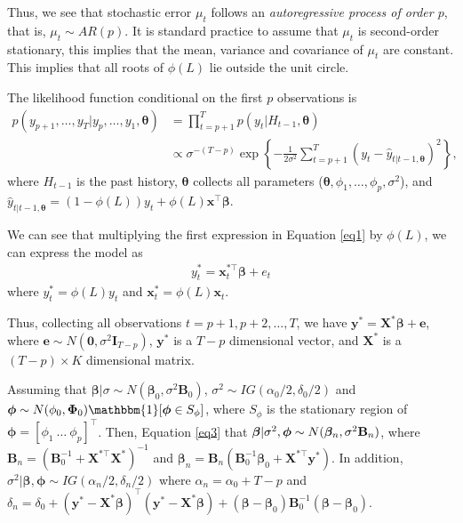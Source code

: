 Thus, we see that stochastic error $\mu_t$ follows an \textit{autoregressive process of order $p$}, that is, $\mu_t\sim AR(p)$. It is standard practice to assume that $\mu_t$ is second-order stationary, this implies that the mean, variance and covariance of $\mu_t$ are constant. This implies that all roots of $\phi(L)$ lie outside the unit circle.

The likelihood function conditional on the first $p$ observations is
\begin{align*}
	p(y_{p+1},\dots,y_T|y_{p},\dots,y_1,\bm{\theta})&=\prod_{t=p+1}^{T}p(y_t|H_{t-1},\bm{\theta})\\
	&\propto \sigma^{-(T-p)}\exp\left\{-\frac{1}{2\sigma^2}\sum_{t=p+1}^T(y_t-\hat{y}_{t|t-1,\bm{\theta}})^2\right\},
\end{align*} 
where $H_{t-1}$ is the past history, $\bm{\theta}$ collects all parameters ($\bm{\theta}, \phi_1,\dots,\phi_p, \sigma^2$), and $\hat{y}_{t|t-1,\bm{\theta}}=(1-\phi(L))y_t+\phi(L)\bm{x}^{\top}\bm{\beta}$.

We can see that multiplying the first expression in Equation \ref{eq1} by $\phi(L)$, we can express the model as 
\begin{align}\label{eq3}
	y_t^*=\bm{x}_t^{*\top}\bm{\beta}+e_t
\end{align}
where $y_t^*=\phi(L)y_t$ and $\bm{x}_t^{*}=\phi(L)\bm{x}_t$.

Thus, collecting all observations $t=p+1,p+2,\dots,T$, we have $\bm{y}^*=\bm{X}^*\bm{\beta}+\bm{e}$, where $\bm{e}\sim N(\bm{0},\sigma^2\bm{I}_{T-p})$, $\bm{y}^*$ is a $T-p$ dimensional vector, and $\bm{X}^*$ is a $(T-p)\times K$ dimensional matrix.

Assuming that $\bm{\beta}|\sigma\sim N(\bm{\beta}_0,\sigma^2\bm{B}_0)$, $\sigma^2\sim IG(\alpha_0/2,\delta_0/2)$ and $\bm{\phi}\sim N(\phi_0,\bm{\Phi}_0)\mathbbm{1}[\bm{\phi}\in S_{\phi}]$, where $S_{\phi}$ is the stationary region of $\bm{\phi}=[\phi_1 \ \dots \ \phi_p]^{\top}$. Then, Equation \ref{eq3} that $\bm{\beta}|\sigma^2,\bm{\phi}\sim N(\bm{\beta}_n, \sigma^2{\bf{B}}_n)$, where $\bm{B}_n = (\bm{B}_0^{-1} + \bm{X}^{*\top}\bm{X}^{*})^{-1}$ and $\bm{\beta}_n = \bm{B}_n(\bm{B}_0^{-1}\bm{\beta}_0 + \bm{X}^{*\top}\bm{y}^{*})$. In addition, $\sigma^2|\bm{\beta},\bm{\phi}\sim IG(\alpha_n/2,\delta_n/2)$ where $\alpha_n=\alpha_0+T-p$ and $\delta_n=\delta_0+(\bm{y}^*-\bm{X}^{*}\bm{\beta})^{\top}(\bm{y}^*-\bm{X}^{*}\bm{\beta})+(\bm{\beta}-\bm{\beta}_0)\bm{B}_0^{-1}(\bm{\beta}-\bm{\beta}_0)$.   
   


